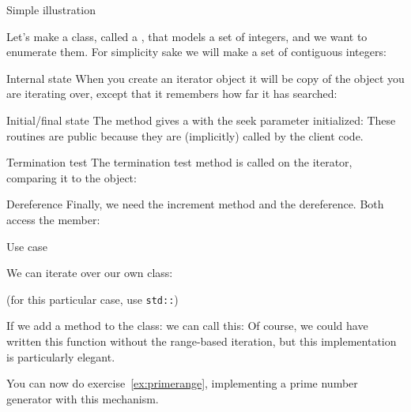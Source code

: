 \begin{block}{Simple illustration}
  \label{sl:bagdata}
  
  Let's make a class, called a , that models a set of integers,
  and we want to enumerate them. For simplicity sake we will make a set
  of contiguous integers:
\end{block}

\begin{block}{Internal state}
  \label{sl:bagseek}
  When you create an iterator object it will be copy of the object you
  are iterating over, except that it remembers how far it has
  searched:
\end{block}

\begin{block}{Initial/final state}
  \label{sl:bagbeginend}
  The  method gives a  with the seek parameter
  initialized:
  These routines are public because they are (implicitly) called by the
  client code.
\end{block}

\begin{block}{Termination test}
  \label{sl:bagtest}
  The termination test method is called on the iterator, comparing it to
  the  object:
\end{block}

\begin{block}{Dereference}
  \label{sl:bagderef}
  Finally, we need the increment method and the dereference. Both access
  the  member:
\end{block}

\begin{block}{Use case}
  \label{sl:bagfind}

  We can iterate over our own class:

  (for this particular case, use \lstinline{std::})
\end{block}

If we add a method  to the class:
%
%
we can call this:
%
%
Of course, we could have written this function
without the range-based iteration, but this implementation is
particularly elegant.

\begin{exercise}
  You can now do exercise~\ref{ex:primerange}, implementing a prime
  number generator with this mechanism.
\end{exercise}

